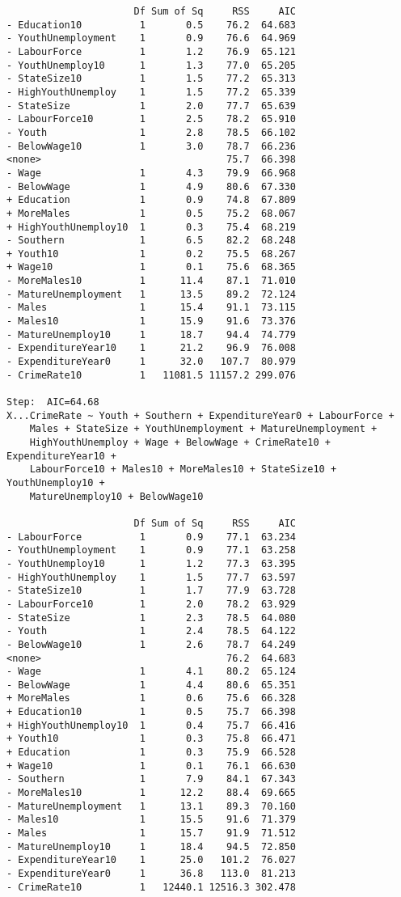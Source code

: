 \documentclass[11pt]{article}
\begin{document}
\begin{enumerate}
\begin{verbatim}
                      Df Sum of Sq     RSS     AIC
- Education10          1       0.5    76.2  64.683
- YouthUnemployment    1       0.9    76.6  64.969
- LabourForce          1       1.2    76.9  65.121
- YouthUnemploy10      1       1.3    77.0  65.205
- StateSize10          1       1.5    77.2  65.313
- HighYouthUnemploy    1       1.5    77.2  65.339
- StateSize            1       2.0    77.7  65.639
- LabourForce10        1       2.5    78.2  65.910
- Youth                1       2.8    78.5  66.102
- BelowWage10          1       3.0    78.7  66.236
<none>                                75.7  66.398
- Wage                 1       4.3    79.9  66.968
- BelowWage            1       4.9    80.6  67.330
+ Education            1       0.9    74.8  67.809
+ MoreMales            1       0.5    75.2  68.067
+ HighYouthUnemploy10  1       0.3    75.4  68.219
- Southern             1       6.5    82.2  68.248
+ Youth10              1       0.2    75.5  68.267
+ Wage10               1       0.1    75.6  68.365
- MoreMales10          1      11.4    87.1  71.010
- MatureUnemployment   1      13.5    89.2  72.124
- Males                1      15.4    91.1  73.115
- Males10              1      15.9    91.6  73.376
- MatureUnemploy10     1      18.7    94.4  74.779
- ExpenditureYear10    1      21.2    96.9  76.008
- ExpenditureYear0     1      32.0   107.7  80.979
- CrimeRate10          1   11081.5 11157.2 299.076

Step:  AIC=64.68
X...CrimeRate ~ Youth + Southern + ExpenditureYear0 + LabourForce + 
    Males + StateSize + YouthUnemployment + MatureUnemployment + 
    HighYouthUnemploy + Wage + BelowWage + CrimeRate10 + ExpenditureYear10 + 
    LabourForce10 + Males10 + MoreMales10 + StateSize10 + YouthUnemploy10 + 
    MatureUnemploy10 + BelowWage10

                      Df Sum of Sq     RSS     AIC
- LabourForce          1       0.9    77.1  63.234
- YouthUnemployment    1       0.9    77.1  63.258
- YouthUnemploy10      1       1.2    77.3  63.395
- HighYouthUnemploy    1       1.5    77.7  63.597
- StateSize10          1       1.7    77.9  63.728
- LabourForce10        1       2.0    78.2  63.929
- StateSize            1       2.3    78.5  64.080
- Youth                1       2.4    78.5  64.122
- BelowWage10          1       2.6    78.7  64.249
<none>                                76.2  64.683
- Wage                 1       4.1    80.2  65.124
- BelowWage            1       4.4    80.6  65.351
+ MoreMales            1       0.6    75.6  66.328
+ Education10          1       0.5    75.7  66.398
+ HighYouthUnemploy10  1       0.4    75.7  66.416
+ Youth10              1       0.3    75.8  66.471
+ Education            1       0.3    75.9  66.528
+ Wage10               1       0.1    76.1  66.630
- Southern             1       7.9    84.1  67.343
- MoreMales10          1      12.2    88.4  69.665
- MatureUnemployment   1      13.1    89.3  70.160
- Males10              1      15.5    91.6  71.379
- Males                1      15.7    91.9  71.512
- MatureUnemploy10     1      18.4    94.5  72.850
- ExpenditureYear10    1      25.0   101.2  76.027
- ExpenditureYear0     1      36.8   113.0  81.213
- CrimeRate10          1   12440.1 12516.3 302.478


\end{verbatim}
\end{enumerate}
\end{document}
